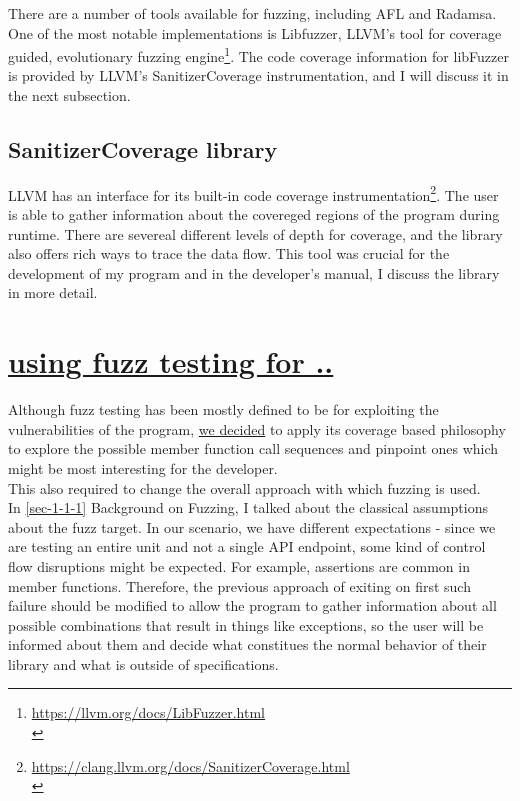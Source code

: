 \documentclass{elteikthesis}[2018/06/06]
\begin{document}
There are a number of tools available for fuzzing, including AFL and Radamsa. One of the most notable implementations is Libfuzzer, LLVM's tool for coverage guided, evolutionary fuzzing engine\footnote{\url{https://llvm.org/docs/LibFuzzer.html} \\}. The code coverage information for libFuzzer is provided by LLVM’s SanitizerCoverage instrumentation, and I will discuss it in the next subsection. \\
\subsection{SanitizerCoverage library}
\label{sec-1-1-2}
LLVM has an interface for its built-in code coverage instrumentation\footnote{\url{https://clang.llvm.org/docs/SanitizerCoverage.html} \\}. The user is able to gather information about the covereged regions of the program during runtime. There are severeal different levels of depth for coverage, and the library also offers rich ways to trace the data flow. This tool was crucial for the development of my program and in the developer's manual, I discuss the library in more detail. \\

\section{\underline{using fuzz testing for ..}}
\label{sec-1-2}
Although fuzz testing has been mostly defined to be for exploiting the vulnerabilities of the program, \uline{we decided} to apply its coverage based philosophy to explore the possible member function call sequences and pinpoint ones which might be most interesting for the developer. \\
This also required to change the overall approach with which fuzzing is used. \\

In \ref{sec-1-1-1} Background on Fuzzing, I talked about the classical assumptions about the fuzz target. In our scenario, we have different expectations - since we are testing an entire unit and not a single API endpoint, some kind of control flow disruptions might be expected. For example, assertions are common in member functions. Therefore, the previous approach of exiting on first such failure should be modified to allow the program to gather information about all possible combinations that result in things like exceptions, so the user will be informed about them and decide what constitues the normal behavior of their library and what is outside of specifications. \\
\end{document}
